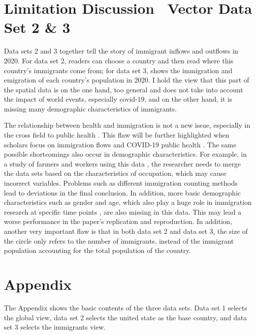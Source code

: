 \documentclass[12pt]{article} %
\begin{document}
\section*{Limitation Discussion \textendash\ Vector Data Set 2 \& 3}

\vspace{.3cm}

\noindent Data sets 2 and 3 together tell the story of immigrant inflows and outflows in 2020. For data set 2, readers can choose a country and then read where this country's immigrants come from; for data set 3, shows the immigration and emigration of each country's population in 2020. I hold the view that this part of the spatial data is on the one hand, too general and does not take into account the impact of world events, especially covid-19, and on the other hand, it is missing many demographic characteristics of immigrants.

\noindent The relationship between health and immigration is not a new issue, especially in the cross field to public health \citep{read2005arab, kandula2004assuring}. This flaw will be further highlighted when scholars focus on immigration flows and COVID-19 public health \citep{page2020undocumented}. The same possible shortcomings also occur in demographic characteristics. For example, in a study of farmers and workers using this data \citep{anderson2021rethinking}, the researcher needs to merge the data sets based on the characteristics of occupation, which may cause incorrect variables. Problems such as different immigration counting methods lead to deviations in the final conclusion. In addition, more basic demographic characteristics such as gender and age, which also play a huge role in immigration research at specific time points \citep{berger2013immigrant, igoa2013inner}, are also missing in this data. This may lead a worse performance in the paper's replication and reproduction. In addition, another very important flaw is that in both data set 2 and data set 3, the size of the circle only refers to the number of immigrants, instead of the immigrant population accounting for the total population of the country. 

\section*{Appendix}

\noindent The Appendix shows the basic contents of the three data sets. Data set 1 selects the global view, data set 2 selects the united state as the base country, and data set 3 selects the immigrants view.
\end{document}
